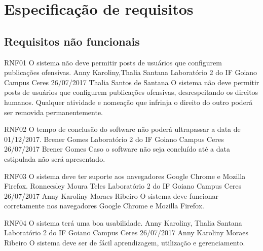 \chapter{Especificação de requisitos}
 	
 \section{Requisitos não funcionais}
 
 \requisitoNaoFuncional
 {RNF01}
 {O sistema não deve permitir posts de usuários que configurem publicações ofensivas.}
 {Anny Karoliny,Thalia Santana}
 {Laboratório 2 do IF Goiano Campus Ceres}
 {26/07/2017}
 {Thalia Santos de Santana}
 {O sistema não deve permitir posts de usuários que configurem publicações ofensivas, desrespeitando os direitos humanos. Qualquer atividade e nomeação que infrinja o direito do outro poderá ser removida permanentemente.
 }
 
 \requisitoNaoFuncional
 {RNF02}
 {O tempo de conclusão do software não poderá ultrapassar a data de 01/12/2017.}
 {Brener Gomes}
 {Laboratório 2 do IF Goiano Campus Ceres}
 {26/07/2017}
 {Brener Gomes}
 {Caso o software não seja concluído até a data estipulada não será apresentado.
 }
 
 \requisitoNaoFuncional
 {RNF03}
 {O sistema deve ter suporte aos navegadores Google Chrome e Mozilla Firefox.}
 {Ronneesley Moura Teles}
 {Laboratório 2 do IF Goiano Campus Ceres}
 {26/07/2017}
 {Anny Karoliny Moraes Ribeiro}
 {O sistema deve funcionar corretamente nos navegadores Google Chrome e Mozilla Firefox.
 }
 
 \requisitoNaoFuncional
 {RNF04}
 {O sistema terá uma boa usabilidade.}
 {Anny Karoliny, Thalia Santana}
 {Laboratório 2 do IF Goiano Campus Ceres}
 {26/07/2017}
 {Anny Karoliny Moraes Ribeiro}
 {O sistema deve ser de fácil aprendizagem, utilização e gerenciamento.
 }


